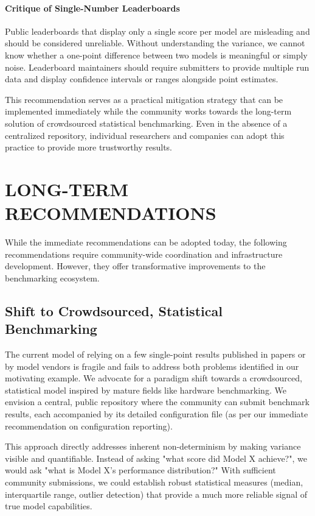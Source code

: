 \documentclass{IEEEcsmag}
\begin{document}
\paragraph{Critique of Single-Number Leaderboards}
Public leaderboards that display only a single score per model are misleading and should be considered unreliable. Without understanding the variance, we cannot know whether a one-point difference between two models is meaningful or simply noise. Leaderboard maintainers should require submitters to provide multiple run data and display confidence intervals or ranges alongside point estimates.

This recommendation serves as a practical mitigation strategy that can be implemented immediately while the community works towards the long-term solution of crowdsourced statistical benchmarking. Even in the absence of a centralized repository, individual researchers and companies can adopt this practice to provide more trustworthy results.

\section{LONG-TERM RECOMMENDATIONS}
\label{sec:longterm-recs}

While the immediate recommendations can be adopted today, the following recommendations require community-wide coordination and infrastructure development. However, they offer transformative improvements to the benchmarking ecosystem.

\subsection{Shift to Crowdsourced, Statistical Benchmarking}
\label{sec:rec2}

The current model of relying on a few single-point results published in papers or by model vendors is fragile and fails to address both problems identified in our motivating example. We advocate for a paradigm shift towards a crowdsourced, statistical model inspired by mature fields like hardware benchmarking. We envision a central, public repository where the community can submit benchmark results, each accompanied by its detailed configuration file (as per our immediate recommendation on configuration reporting).

This approach directly addresses inherent non-determinism by making variance visible and quantifiable. Instead of asking "what score did Model X achieve?", we would ask "what is Model X's performance distribution?" With sufficient community submissions, we could establish robust statistical measures (median, interquartile range, outlier detection) that provide a much more reliable signal of true model capabilities.
\end{document}
